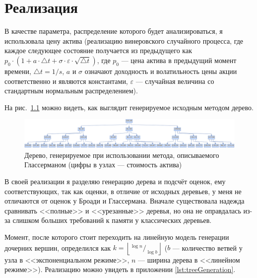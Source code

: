\documentclass[specialist,
               substylefile = spbu.rtx,
               subf,href,colorlinks=true, 12pt]{disser}
\begin{document}
\chapter{Реализация}
	\par В качестве параметра, распределение которого будет анализироваться, я использовала цену актива (реализацию винеровского случайного процесса, где каждое следующее состояние получается из предыдущего как $p_0 \cdot (1 + a\cdot \bigtriangleup t + \sigma \cdot \varepsilon \cdot \sqrt{\bigtriangleup t})$, где $p_0$ --- цена актива в предыдущий момент времени, $\bigtriangleup t = 1/s$, $a$ и $\sigma$ означают доходность и волатильность цены акции соответственно и являются константами, $\varepsilon$ --- случайная величина со стандартным нормальным распределением).
	\par На рис.~\ref{fig:exponentialTree} можно видеть, как выглядит генерируемое исходным методом дерево.
	\begin{figure}[h]
		\includegraphics[width=\textwidth]{exp_tree}
		\caption{Дерево, генерируемое при использовании метода, описываемого Глассерманом (цифры в узлах --- стоимость актива)}
		\label{fig:exponentialTree}
	\end{figure}
	\par В своей реализации я разделяю генерацию дерева и подсчёт оценок, ему соответствующих, так как оценки, в отличие от исходных деревьев, у меня не отличаются от оценок у Броади и Глассермана. Вначале существовала надежда сравнивать <<полные>> и <<урезанные>> деревья, но она не оправдалась из-за слишком больших требований к памяти у классических деревьев.
	\par Момент, после которого стоит переходить на линейную модель генерации дочерних вершин, определился как $k = \left\lfloor ^{\log n} / _{\log b}\right\rfloor$ ($b$ --- количество ветвей у узла в <<экспоненциальном режиме>>, $n$ --- ширина дерева в <<линейном режиме>>). Реализацию можно увидеть в приложении \ref{lst:treeGeneration}.
	
\end{document}
